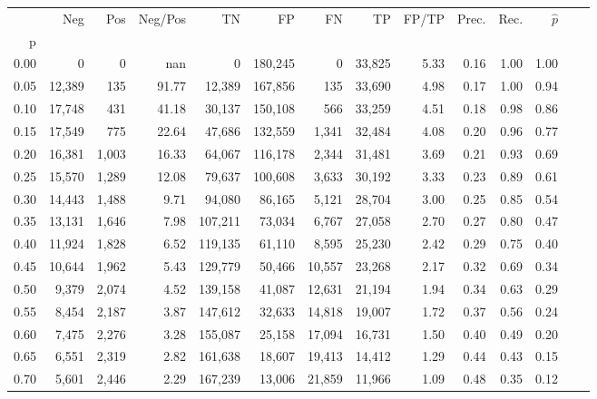 \begin{tabular}{rrrrrrrrrrrrrr}
\toprule
{} &     Neg &    Pos & Neg/Pos &       TN &       FP &      FN &      TP & FP/TP & Prec. &  Rec. & $\hat{p}$ \\
p    &         &        &         &          &          &         &         &       &       &       &           \\
\midrule
0.00 &       0 &      0 &     nan &        0 &  180,245 &       0 &  33,825 &  5.33 &  0.16 &  1.00 &      1.00 \\
0.05 &  12,389 &    135 &   91.77 &   12,389 &  167,856 &     135 &  33,690 &  4.98 &  0.17 &  1.00 &      0.94 \\
0.10 &  17,748 &    431 &   41.18 &   30,137 &  150,108 &     566 &  33,259 &  4.51 &  0.18 &  0.98 &      0.86 \\
0.15 &  17,549 &    775 &   22.64 &   47,686 &  132,559 &   1,341 &  32,484 &  4.08 &  0.20 &  0.96 &      0.77 \\
0.20 &  16,381 &  1,003 &   16.33 &   64,067 &  116,178 &   2,344 &  31,481 &  3.69 &  0.21 &  0.93 &      0.69 \\
0.25 &  15,570 &  1,289 &   12.08 &   79,637 &  100,608 &   3,633 &  30,192 &  3.33 &  0.23 &  0.89 &      0.61 \\
0.30 &  14,443 &  1,488 &    9.71 &   94,080 &   86,165 &   5,121 &  28,704 &  3.00 &  0.25 &  0.85 &      0.54 \\
0.35 &  13,131 &  1,646 &    7.98 &  107,211 &   73,034 &   6,767 &  27,058 &  2.70 &  0.27 &  0.80 &      0.47 \\
0.40 &  11,924 &  1,828 &    6.52 &  119,135 &   61,110 &   8,595 &  25,230 &  2.42 &  0.29 &  0.75 &      0.40 \\
0.45 &  10,644 &  1,962 &    5.43 &  129,779 &   50,466 &  10,557 &  23,268 &  2.17 &  0.32 &  0.69 &      0.34 \\
0.50 &   9,379 &  2,074 &    4.52 &  139,158 &   41,087 &  12,631 &  21,194 &  1.94 &  0.34 &  0.63 &      0.29 \\
0.55 &   8,454 &  2,187 &    3.87 &  147,612 &   32,633 &  14,818 &  19,007 &  1.72 &  0.37 &  0.56 &      0.24 \\
0.60 &   7,475 &  2,276 &    3.28 &  155,087 &   25,158 &  17,094 &  16,731 &  1.50 &  0.40 &  0.49 &      0.20 \\
0.65 &   6,551 &  2,319 &    2.82 &  161,638 &   18,607 &  19,413 &  14,412 &  1.29 &  0.44 &  0.43 &      0.15 \\
0.70 &   5,601 &  2,446 &    2.29 &  167,239 &   13,006 &  21,859 &  11,966 &  1.09 &  0.48 &  0.35 &      0.12 \\

\end{tabular}
